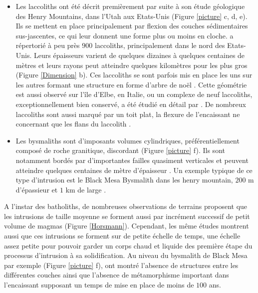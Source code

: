 \begin{itemize}
\item    Les   laccoliths    ont   été    décrit   premièrement    par
  \citet{Gilbert:1877uk}  suite  à  son  étude  géologique  des  Henry
  Mountains, dans  l'Utah aux  Etats-Unis (Figure \ref{picture}  c, d,
  e).  Ils se mettent en  place principalement par flexion des couches
  sédimentaires sus-jascentes, ce  qui leur donnent une  forme plus ou
  moins en  cloche.  \citet{E:2015tl}  a répertorié  à peu  près $900$
  laccoliths,  principalement  dans  le nord  des  Etats-Unis.   Leurs
  épaisseurs  varient de  quelques  dizaines à  quelques centaines  de
  mètres et leurs  rayons peut atteindre quelques  kilomètres pour les
  plus  gros  (Figure  \ref{Dimension}  b).  Ces  laccoliths  se  sont
  parfois mis en place les uns sur les autres formant une structure en
  forme d'arbre  de noël \citep{E:2015tl}.  Cette  géométrie est aussi
  observé  sur  l'île  d'Elbe,  en  Italie, ou  un  complexe  de  neuf
  laccoliths, exceptionnellement bien conservé, a été étudié en détail
  par \citet{Rocchi:2002jy}. De nombreux  laccoliths sont aussi marqué
  par un toit  plat, la flexure de l'encaissant ne  concernant que les
  flans du laccolith \citep{Koch:1981if}.

\item   Les   bysmaliths   sont  d'imposants   volumes   cylindriques,
  préférentiellement composé  de roche granitique,  discordant (Figure
  \ref{picture}  f).   Ils  sont notamment  bordés  par  d'importantes
  failles quasiment verticales et peuvent atteindre quelques centaines
  de mètre  d'épaisseur \citep{Johnson:1973ho}. Un exemple  typique de
  ce  type d'intrusion  est le  Black  Mesa Bysmalith  dans les  henry
  mountain, $200$ m d'épassieur et $1$ km de large \citep{Morgan:2008hj}.
\end{itemize}

A  l'instar des  batholiths,  de nombreuses  observations de  terrains
proposent que  les intrusions de  taille moyenne se forment  aussi par
incrément     successif     de      petit     volume     de     magmas
\citep{Habert:2004wg,Horsman:2005ct}      (Figure     \ref{Horsmann}).
Cependant,  les  même études  montrent  aussi  que ces  intrusions  se
forment sur de petite échelle de  temps, une échelle assez petite pour
pouvoir  garder  un corps  chaud  et  liquide  des première  étape  du
processus d'intrusion à  sa solidification. Au niveau  du bysmalith de
Black Mesa par exemple (Figure \ref{picture} f), \citet{Habert:2004wg}
ont montré l'absence de structures entre les différentes couches ainsi
que l'absence  de métamorphisme important dans  l'encaissant supposant
un temps de mise en place de moins de $100$ ans.

